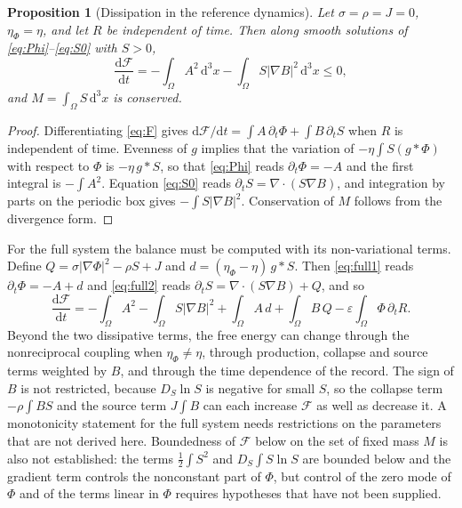 \documentclass[11pt]{article}
\newtheorem{proposition}{Proposition}[section]
\theoremstyle{definition}
\theoremstyle{remark}
\newcommand{\dd}{\mathrm{d}}
\newcommand{\FF}{\mathcal{F}}
\begin{document}
\begin{proposition}[Dissipation in the reference dynamics]\label{prop:lyap}
Let $\sigma=\rho=J=0$, $\eta_\Phi=\eta$, and let $R$ be independent of time. Then along smooth solutions of \eqref{eq:Phi}--\eqref{eq:S0} with $S>0$,
\begin{equation}
\frac{\dd\FF}{\dd t}=-\int_\Omega A^2\,\dd^3x-\int_\Omega S|\nabla B|^2\,\dd^3x\le0,
\end{equation}
and $M=\int_\Omega S\,\dd^3x$ is conserved.
\end{proposition}

\begin{proof}
Differentiating \eqref{eq:F} gives $\dd\FF/\dd t=\int A\,\partial_t\Phi+\int B\,\partial_tS$ when $R$ is independent of time. Evenness of $g$ implies that the variation of $-\eta\int S(g*\Phi)$ with respect to $\Phi$ is $-\eta\,g*S$, so that \eqref{eq:Phi} reads $\partial_t\Phi=-A$ and the first integral is $-\int A^2$. Equation \eqref{eq:S0} reads $\partial_tS=\nabla\!\cdot\!(S\nabla B)$, and integration by parts on the periodic box gives $-\int S|\nabla B|^2$. Conservation of $M$ follows from the divergence form.
\end{proof}

For the full system the balance must be computed with its non-variational terms. Define $Q=\sigma|\nabla\Phi|^2-\rho S+J$ and $d=(\eta_\Phi-\eta)\,g*S$. Then \eqref{eq:full1} reads $\partial_t\Phi=-A+d$ and \eqref{eq:full2} reads $\partial_tS=\nabla\!\cdot\!(S\nabla B)+Q$, and so
\begin{equation}
\frac{\dd\FF}{\dd t}=-\int_\Omega A^2-\int_\Omega S|\nabla B|^2+\int_\Omega A\,d+\int_\Omega B\,Q-\varepsilon\int_\Omega\Phi\,\partial_tR.
\label{eq:balance}
\end{equation}
Beyond the two dissipative terms, the free energy can change through the nonreciprocal coupling when $\eta_\Phi\ne\eta$, through production, collapse and source terms weighted by $B$, and through the time dependence of the record. The sign of $B$ is not restricted, because $D_S\ln S$ is negative for small $S$, so the collapse term $-\rho\int BS$ and the source term $J\int B$ can each increase $\FF$ as well as decrease it. A monotonicity statement for the full system needs restrictions on the parameters that are not derived here. Boundedness of $\FF$ below on the set of fixed mass $M$ is also not established: the terms $\tfrac12\int S^2$ and $D_S\int S\ln S$ are bounded below and the gradient term controls the nonconstant part of $\Phi$, but control of the zero mode of $\Phi$ and of the terms linear in $\Phi$ requires hypotheses that have not been supplied.
\end{document}
